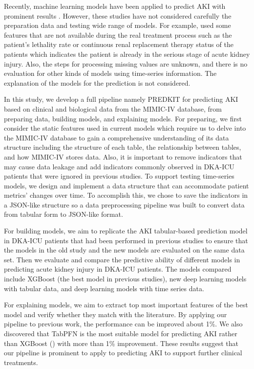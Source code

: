 \documentclass[sn-mathphys-num]{sn-jnl}%
\theoremstyle{thmstyleone}%
\theoremstyle{thmstyletwo}%
\theoremstyle{thmstylethree}%
\begin{document}
Recently, machine learning models have been applied to predict AKI with prominent results \citep{xgboost-aki-dka}. However, these studies have not considered carefully the preparation data and testing wide range of models. For example,  \citep{xgboost-aki-dka} used some features that are not available during the real treatment process such as the patient's lethality rate or continuous renal replacement therapy status of the patients which indicates the patient is already in the serious stage of acute kidney injury. Also, the steps for processing missing values are unknown, and there is no evaluation for other kinds of models using time-series information. The explanation of the models for the prediction is not considered.

In this study, we develop a full pipeline namely PREDKIT for predicting AKI based on clinical and biological data from the MIMIC-IV database, from preparing data, building models, and explaining models. For preparing, we first consider the static features used in current models which require us to delve into the MIMIC-IV database to gain a comprehensive understanding of its data structure including the structure of each table, the relationship between tables, and how MIMIC-IV stores data. Also, it is important to remove indicators that may cause data leakage and add indicators commonly observed in DKA-ICU patients that were ignored in previous studies. To support testing time-series models, we design and implement a data structure that can accommodate patient metrics' changes over time.
To accomplish this, we chose to save the indicators in a JSON-like structure so a data preprocessing pipeline was built to convert data from tabular form to JSON-like format.

For building models, we aim to replicate the AKI tabular-based prediction model in DKA-ICU patients that had been performed in previous studies to ensure that the models in the old study and the new models are evaluated on the same data set.
Then we evaluate and compare the predictive ability of different models in predicting acute kidney injury in DKA-ICU patients.
The models compared include XGBoost (the best model in previous studies), new deep learning models with tabular data, and deep learning models with time series data.

For explaining models, we aim to extract top most important features of the best model and verify whether they match with the literature. By applying our pipeline to previous work, the performance can be improved about 1\%. We also discovered that TabPFN is the most suitable model for predicting AKI rather than XGBoost (\citep{xgboost-aki-dka}) with more than 1\% improvement. These results suggest that our pipeline is prominent to apply to predicting AKI to support further clinical treatments.
\end{document}
